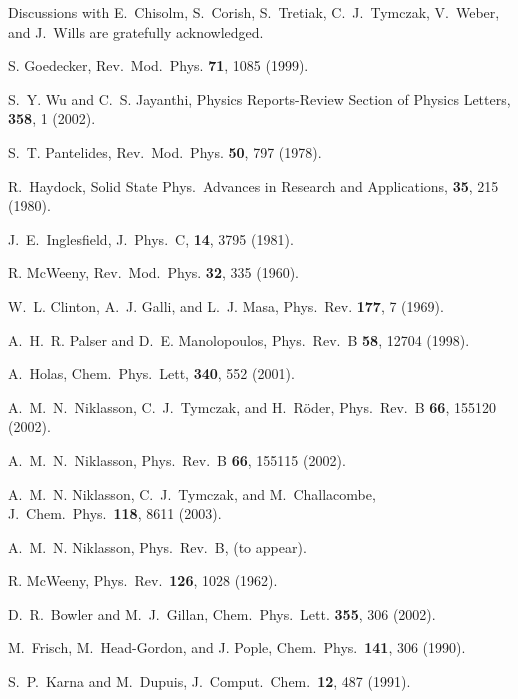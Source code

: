 \documentclass[prl,aps,twocolumn,showpacs,twocolumngrid,superbib]{revtex4}
\begin{document}
Discussions with  E.\ Chisolm, S.\ Corish, S.\ Tretiak, C.\ J.\ Tymczak, V.\ Weber, 
and J.\ Wills are gratefully acknowledged.


\begin{references}


 S. Goedecker,
Rev.\ Mod.\ Phys. {\bf 71}, 1085 (1999).

 S.\ Y. Wu and C.\ S. Jayanthi,
Physics Reports-Review Section of Physics Letters, {\bf 358}, 1 (2002).

 S.\ T. Pantelides,
Rev.\ Mod.\ Phys. {\bf 50}, 797 (1978).

 R.\ Haydock, 
Solid State Phys.\ Advances in Research and Applications, {\bf 35}, 215 (1980).

 J.\ E.\ Inglesfield,
J.\ Phys.\ C, {\bf 14}, 3795 (1981).

 R. McWeeny,
Rev.\ Mod.\ Phys. {\bf 32}, 335 (1960).

 W.\ L. Clinton, A.\ J. Galli, and L.\ J. Masa,
Phys.\ Rev. {\bf 177}, 7 (1969).

 A.\ H.\ R. Palser and D.\ E. Manolopoulos,
Phys.\ Rev.\ B {\bf 58}, 12704 (1998).

 A.\ Holas,
Chem.\ Phys.\ Lett, {\bf 340}, 552 (2001).

 A.\ M.\ N.\ Niklasson, C.\ J.\ Tymczak, and H.\ R\"{o}der,
Phys.\ Rev.\ B {\bf 66}, 155120 (2002).

 A.\ M.\ N.\ Niklasson, 
Phys.\ Rev.\ B {\bf 66}, 155115 (2002). 

 A.\ M.\ N. Niklasson, C.\ J.\ Tymczak, and M.\ Challacombe,
J.\ Chem.\ Phys.\ {\bf 118}, 8611 (2003).

 A.\ M.\ N. Niklasson,
Phys.\ Rev.\ B, (to appear).

 R. McWeeny, 
Phys.\ Rev.\ {\bf 126}, 1028 (1962).

 D.\ R.\ Bowler and M.\ J.\ Gillan,
Chem.\ Phys.\ Lett. {\bf 355}, 306 (2002).

 M.\ Frisch, M.\ Head-Gordon, and J. Pople,
Chem.\ Phys.\ {\bf 141}, 306 (1990).

 S.\ P.\ Karna and M.\ Dupuis,
J.\ Comput.\ Chem.\ {\bf 12}, 487 (1991).


\end{references}
\end{document}
